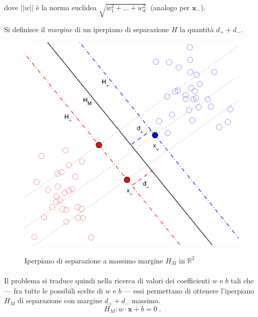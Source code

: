\vspace{2mm} dove $||w||$ è la norma euclidea $\sqrt{w_1^2 + ... + w_d^2} \;$ (analogo per $\boldsymbol{x_-}$).

Si definisce il \textit{margine} di un iperpiano di separazione $H$ la quantità $d_+ + d_-$.

\begin{figure} %
 	\centering	
	
	\fboxsep=0mm%
	\fboxrule=1mm%

	 {		
		\includegraphics[scale=0.9]{img/FiguraC_margine.eps}
	}	
	\caption{Iperpiano di separazione a massimo margine $H_M$ in $\mathbb{R}^2$}
\end{figure}

\paragraph{}
Il problema si traduce quindi nella ricerca di valori dei coefficienti $w$ e $b$ tali che --- fra tutte le possibili scelte di $w$ e $b$ --- essi permettano di ottenere l'iperpiano $H_M$ di separazione con margine $d_+ + d_-$ massimo.
\begin{equation}
	H_M:  w \cdot \boldsymbol{x} + b = 0 \;.
\end{equation}

